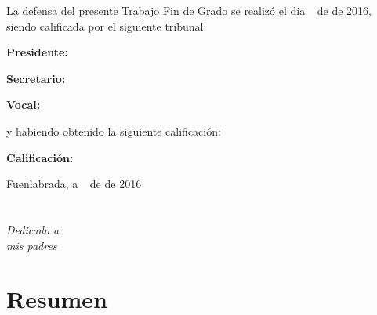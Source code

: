 \documentclass[a4paper, 12pt]{book}
\begin{document}
\vspace{1cm}
La defensa del presente Trabajo Fin de Grado se realizó el día \qquad$\;\,$ de \qquad\qquad\qquad\qquad \newline de 2016, siendo calificada por el siguiente tribunal:


\vspace{0.5cm}
\textbf{Presidente:}

\vspace{1.2cm}
\textbf{Secretario:}

\vspace{1.2cm}
\textbf{Vocal:}


\vspace{1.2cm}
y habiendo obtenido la siguiente calificación:

\vspace{1cm}
\textbf{Calificación:}


\vspace{1cm}
\begin{flushright}
Fuenlabrada, a \qquad$\;\,$ de \qquad\qquad\qquad\qquad de 2016
\end{flushright}


\chapter*{}
\begin{flushright}
\textit{Dedicado a \\
mis padres}
\end{flushright}






\chapter*{Resumen}
\end{document}
